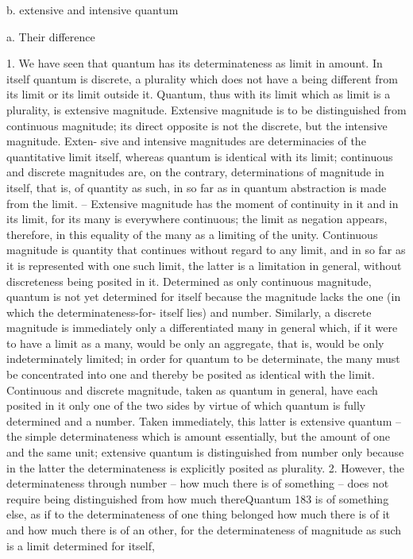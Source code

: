 b. extensive and intensive quantum

a. Their difference

1. We have seen that quantum has its determinateness as limit in amount. In
itself quantum is discrete, a plurality which does not have a being different
from its limit or its limit outside it. Quantum, thus with its limit which as
limit is a plurality, is extensive magnitude.
Extensive magnitude is to be distinguished from continuous magnitude;
its direct opposite is not the discrete, but the intensive magnitude. Exten-
sive and intensive magnitudes are determinacies of the quantitative limit
itself, whereas quantum is identical with its limit; continuous and discrete
magnitudes are, on the contrary, determinations of magnitude in itself, that
is, of quantity as such, in so far as in quantum abstraction is made from
the limit. – Extensive magnitude has the moment of continuity in it and
in its limit, for its many is everywhere continuous; the limit as negation
appears, therefore, in this equality of the many as a limiting of the unity.
Continuous magnitude is quantity that continues without regard to any
limit, and in so far as it is represented with one such limit, the latter is
a limitation in general, without discreteness being posited in it. Determined
as only continuous magnitude, quantum is not yet determined for itself
because the magnitude lacks the one (in which the determinateness-for-
itself lies) and number. Similarly, a discrete magnitude is immediately only
a differentiated many in general which, if it were to have a limit as a many,
would be only an aggregate, that is, would be only indeterminately limited;
in order for quantum to be determinate, the many must be concentrated
into one and thereby be posited as identical with the limit. Continuous
and discrete magnitude, taken as quantum in general, have each posited in
it only one of the two sides by virtue of which quantum is fully determined
and a number. Taken immediately, this latter is extensive quantum – the
simple determinateness which is amount essentially, but the amount of one
and the same unit; extensive quantum is distinguished from number only
because in the latter the determinateness is explicitly posited as plurality.
2. However, the determinateness through number – how much there is
of something – does not require being distinguished from how much thereQuantum
183
is of something else, as if to the determinateness of one thing belonged
how much there is of it and how much there is of an other, for the
determinateness of magnitude as such is a limit determined for itself,
